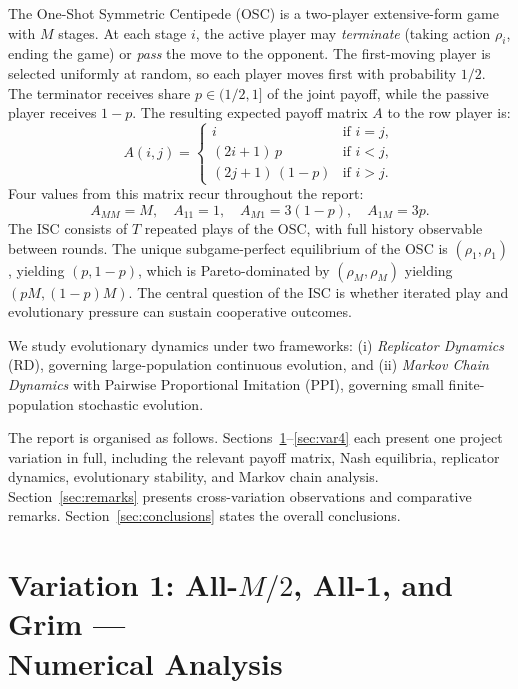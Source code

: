 \documentclass[12pt,a4paper]{article}
\begin{document}
The One-Shot Symmetric Centipede (OSC) is a two-player extensive-form game with
$M$ stages. At each stage $i$, the active player may \emph{terminate} (taking
action $\rho_i$, ending the game) or \emph{pass} the move to the opponent. The
first-moving player is selected uniformly at random, so each player moves first
with probability $1/2$. The terminator receives share $p \in (1/2, 1]$ of the
joint payoff, while the passive player receives $1-p$. The resulting expected
payoff matrix $A$ to the row player is:
\[
  A(i,j) = \begin{cases}
    i                  & \text{if } i = j, \\
    (2i+1)\,p          & \text{if } i < j, \\
    (2j+1)\,(1-p)      & \text{if } i > j.
  \end{cases}
\]
Four values from this matrix recur throughout the report:
\[
  A_{MM} = M, \quad A_{11} = 1, \quad A_{M1} = 3(1-p), \quad A_{1M} = 3p.
\]
The ISC consists of $T$ repeated plays of the OSC, with full history observable
between rounds. The unique subgame-perfect equilibrium of the OSC is $(\rho_1,
\rho_1)$, yielding $(p, 1-p)$, which is Pareto-dominated by $(\rho_M, \rho_M)$
yielding $(pM, (1-p)M)$. The central question of the ISC is whether iterated
play and evolutionary pressure can sustain cooperative outcomes.

We study evolutionary dynamics under two frameworks: (i) \emph{Replicator
Dynamics} (RD), governing large-population continuous evolution, and (ii)
\emph{Markov Chain Dynamics} with Pairwise Proportional Imitation (PPI),
governing small finite-population stochastic evolution.

The report is organised as follows. Sections~\ref{sec:var1}--\ref{sec:var4}
each present one project variation in full, including the relevant payoff matrix,
Nash equilibria, replicator dynamics, evolutionary stability, and Markov chain
analysis. Section~\ref{sec:remarks} presents cross-variation observations and
comparative remarks. Section~\ref{sec:conclusions} states the overall conclusions.

\section{Variation 1: All-\texorpdfstring{$M/2$}{M/2}, All-1, and Grim ---\\
Numerical Analysis}
\label{sec:var1}
\end{document}
